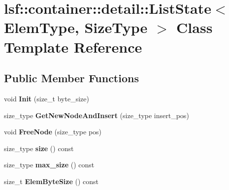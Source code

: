 \hypertarget{classlsf_1_1container_1_1detail_1_1ListState}{
\section{lsf::container::detail::ListState$<$ ElemType, SizeType $>$ Class Template Reference}
\label{classlsf_1_1container_1_1detail_1_1ListState}
}
\subsection*{Public Member Functions}
\begin{DoxyCompactItemize}
\item 
\hypertarget{classlsf_1_1container_1_1detail_1_1ListState_a53915fc670975d2272590bbd9186ca90}{
void {\bfseries Init} (size\_\-t byte\_\-size)}
\label{classlsf_1_1container_1_1detail_1_1ListState_a53915fc670975d2272590bbd9186ca90}

\item 
\hypertarget{classlsf_1_1container_1_1detail_1_1ListState_ac1de0d5feec59a3528c9196c0d8c35e3}{
size\_\-type {\bfseries GetNewNodeAndInsert} (size\_\-type insert\_\-pos)}
\label{classlsf_1_1container_1_1detail_1_1ListState_ac1de0d5feec59a3528c9196c0d8c35e3}

\item 
\hypertarget{classlsf_1_1container_1_1detail_1_1ListState_a3e13ba9c59c8daf0ad4ca41ac69f1d89}{
void {\bfseries FreeNode} (size\_\-type pos)}
\label{classlsf_1_1container_1_1detail_1_1ListState_a3e13ba9c59c8daf0ad4ca41ac69f1d89}

\item 
\hypertarget{classlsf_1_1container_1_1detail_1_1ListState_adb7c86d17486812aa862d5784f34faea}{
size\_\-type {\bfseries size} () const }
\label{classlsf_1_1container_1_1detail_1_1ListState_adb7c86d17486812aa862d5784f34faea}

\item 
\hypertarget{classlsf_1_1container_1_1detail_1_1ListState_a78a102d8552cd41ede568c750b3c75d9}{
size\_\-type {\bfseries max\_\-size} () const }
\label{classlsf_1_1container_1_1detail_1_1ListState_a78a102d8552cd41ede568c750b3c75d9}

\item 
\hypertarget{classlsf_1_1container_1_1detail_1_1ListState_ae21c4740ff49b4b1459a41b1afac367e}{
size\_\-t {\bfseries ElemByteSize} () const }
\label{classlsf_1_1container_1_1detail_1_1ListState_ae21c4740ff49b4b1459a41b1afac367e}


\end{DoxyCompactItemize}
